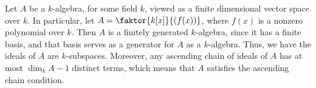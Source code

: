  \begin{example}\label{example_1.2}
     Let $A$ be a  $k$-algebra, for some field  $k$, viewed as a finite
     dimensional vector space over  $k$. In particular, let
     $A=\faktor{k[x]}{(f(x))}$, where $f(x)$ is a nonzero polynomial over $k$.
     Then  $A$ is a finitely generated  $k$-algebra, since it has a finite
     basis, and that basis serves as a generator for $A$ as a  $k$-algebra.
     Thus, we have the ideals of $A$ are $k$-subspaces. Moreover, any ascending
     chain of ideals of $A$ has at most  $\dim_k{A}-1$ distinct terms, which
     means that $A$ satisfies the ascending chain condition.
 \end{example}
